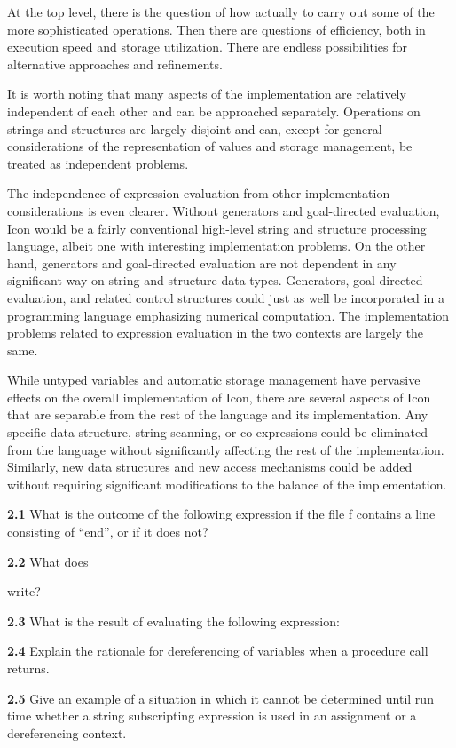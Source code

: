 At the top level, there is the question of how actually to carry out
some of the more sophisticated operations. Then there are questions of
efficiency, both in execution speed and storage utilization. There are
endless possibilities for alternative approaches and refinements.

It is worth noting that many aspects of the implementation are
relatively independent of each other and can be approached
separately. Operations on strings and structures are largely disjoint
and can, except for general considerations of the representation of
values and storage management, be treated as independent problems.

The independence of expression evaluation from other implementation
considerations is even clearer. Without generators and goal-directed
evaluation, Icon would be a fairly conventional high-level string and
structure processing language, albeit one with interesting
implementation problems. On the other hand, generators and
goal-directed evaluation are not dependent in any significant way on
string and structure data types. Generators, goal-directed evaluation,
and related control structures could just as well be incorporated in a
programming language emphasizing numerical computation. The
implementation problems related to expression evaluation in the two
contexts are largely the same.

While untyped variables and automatic storage management have
pervasive effects on the overall implementation of Icon, there are
several aspects of Icon that are separable from the rest of the
language and its implementation. Any specific data structure, string
scanning, or co-expressions could be eliminated from the language
without significantly affecting the rest of the
implementation. Similarly, new data structures and new access
mechanisms could be added without requiring significant modifications
to the balance of the implementation.

\bigskip


\textbf{2.1} What is the outcome of the following expression if the
file f contains a line consisting of ``end'', or if it does not?


\textbf{2.2} What does


\noindent write?

\textbf{2.3} What is the result of evaluating the following expression:


\textbf{2.4} Explain the rationale for dereferencing of variables when
a procedure call returns.

\textbf{2.5} Give an example of a situation in which it cannot be
determined until run time whether a string subscripting expression is
used in an assignment or a dereferencing context.
